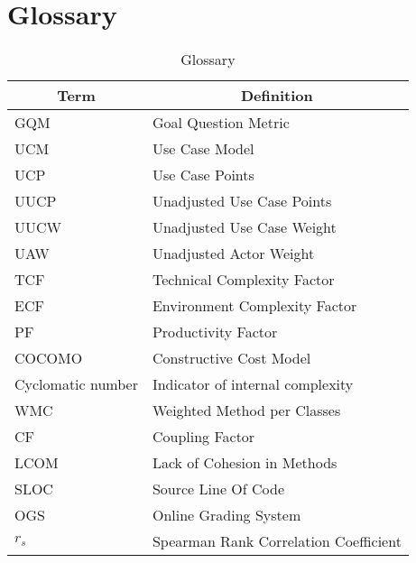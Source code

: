 \documentclass[12pt]{article}
\begin{document}
\section{Glossary}
\begin{table}[h]
\centering
\begin{tabular}{|l|l|}
\hline
\multicolumn{1}{|c|}{\textbf{Term}} & \multicolumn{1}{c|}{\textbf{Definition}} \\ \hline
GQM & Goal Question Metric \\ \hline
UCM & Use Case Model \\ \hline
UCP & Use Case Points \\ \hline
UUCP & Unadjusted Use Case Points \\ \hline
UUCW & Unadjusted Use Case Weight \\ \hline
UAW & Unadjusted Actor Weight \\ \hline
TCF & Technical Complexity Factor \\ \hline
ECF & Environment Complexity Factor \\ \hline
PF & Productivity Factor \\ \hline
COCOMO & Constructive Cost Model \\ \hline
Cyclomatic number & Indicator of internal complexity \\ \hline
WMC & Weighted Method per Classes \\ \hline
CF & Coupling Factor \\ \hline
LCOM & Lack of Cohesion in Methods \\ \hline
SLOC & Source Line Of Code \\ \hline
OGS & Online Grading System \\ \hline
$r_{s}$ & Spearman Rank Correlation Coefficient \\ \hline
\end{tabular}
\caption{Glossary}
\end{table}
{}

\end{document}
